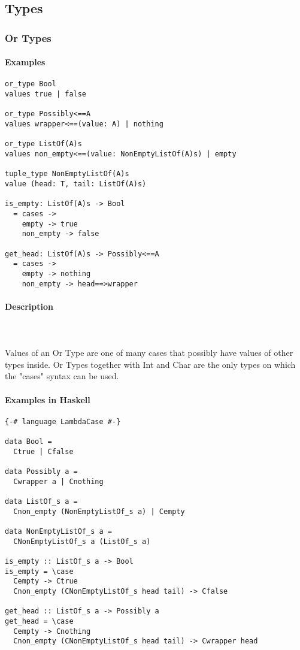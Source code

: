 \documentclass{article}
\def\H{Haskell}
\begin{document}
\subsection{Types}

\subsubsection{Or Types}

\paragraph{Examples}

\begin{verbatim}
or_type Bool
values true | false

or_type Possibly<==A
values wrapper<==(value: A) | nothing

or_type ListOf(A)s
values non_empty<==(value: NonEmptyListOf(A)s) | empty

tuple_type NonEmptyListOf(A)s
value (head: T, tail: ListOf(A)s)

is_empty: ListOf(A)s -> Bool
  = cases -> 
    empty -> true
    non_empty -> false

get_head: ListOf(A)s -> Possibly<==A
  = cases -> 
    empty -> nothing
    non_empty -> head==>wrapper
\end{verbatim}

\paragraph{Description}\mbox{} \\\\
Values of an Or Type are one of many cases that possibly have values of other types
inside. Or Types together with Int and Char are the only types on which the "cases"
syntax can be used.

\paragraph{Examples in \H}

\begin{verbatim}
{-# language LambdaCase #-}

data Bool =
  Ctrue | Cfalse

data Possibly a =
  Cwrapper a | Cnothing

data ListOf_s a =
  Cnon_empty (NonEmptyListOf_s a) | Cempty

data NonEmptyListOf_s a =
  CNonEmptyListOf_s a (ListOf_s a)

is_empty :: ListOf_s a -> Bool
is_empty = \case
  Cempty -> Ctrue
  Cnon_empty (CNonEmptyListOf_s head tail) -> Cfalse

get_head :: ListOf_s a -> Possibly a
get_head = \case
  Cempty -> Cnothing
  Cnon_empty (CNonEmptyListOf_s head tail) -> Cwrapper head
\end{verbatim}
\end{document}
